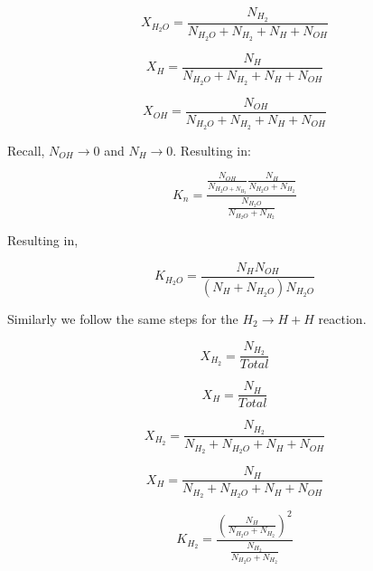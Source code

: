 \documentclass[12pt, Times New Roman]{article}
\begin{document}
    \begin{equation}
        X_{H_{2}O} = \frac{N_{H_{2}}}{N_{H_{2}O} + N_{H_{2}} + N_{H} + N_{OH}}
    \end{equation}

    \begin{equation}
        X_{H} = \frac{N_{H}}{N_{H_{2}O} + N_{H_{2}} + N_{H} + N_{OH}}
    \end{equation}

    \begin{equation}
        X_{OH} = \frac{N_{OH}}{N_{H_{2}O} + N_{H_{2}} + N_{H} + N_{OH}}
    \end{equation}

    Recall, $N_{OH} \rightarrow 0$ and $N_{H} \rightarrow 0$. Resulting in:

    \begin{equation}
        K_{n} = \frac{\frac{N_{OH}}{N_{H_{2}O + N_{H_{2}}}} \frac{N_{H}}{N_{H_{2}O} + N_{H_{2}}}}{\frac{N_{H_{2}O}}{N_{H_{2}O} + N_{H_{2}}}}
    \end{equation}

    Resulting in,

    \begin{equation}
        K_{H_{2}O} = \frac{N_{H} N_{OH}}{(N_{H} + N_{H_{2}O}) N_{H_{2}O}}
    \end{equation}

    Similarly we follow the same steps for the $H_{2} \rightarrow H + H$ reaction.

    \begin{equation}
        X_{H_{2}} = \frac{N_{H_{2}}}{Total}
    \end{equation}

    \begin{equation}
        X_{H} = \frac{N_{H}}{Total}
    \end{equation}

    \begin{equation}
        X_{H_{2}} = \frac{N_{H_{2}}}{N_{H_{2}} + N_{H_{2}O} + N_{H} + N_{OH}}
    \end{equation}

    \begin{equation}
        X_{H} = \frac{N_{H}}{N_{H_{2}} + N_{H_{2}O} + N_{H} + N_{OH}}
    \end{equation}

    \begin{equation}
        K_{H_{2}} = \frac{(\frac{N_{H}}{N_{H_{2}O} + N_{H_{2}}})^{2}}{\frac{N_{H_{2}}}{N_{H_{2}O} + N_{H_{2}}}}
    \end{equation}
\end{document}
